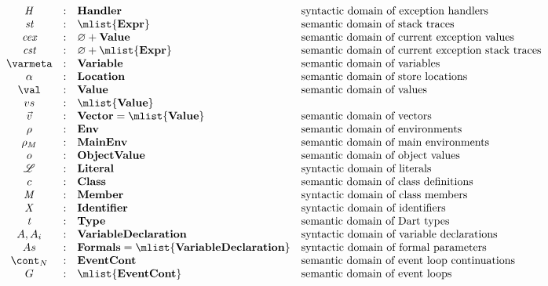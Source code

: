 \documentclass[a4paper,oneside,fleqn]{article}
\renewcommand{\emptyset}{\varnothing}
\newcommand{\dexpr}{\mathbf{Expr}}
\newcommand{\dhandler}{\mathbf{Handler}}
\newcommand{\dncont}{\mathbf{EventCont}}
\newcommand{\denv}{\mathbf{Env}}
\newcommand{\dmenv}{\mathbf{MainEnv}}
\newcommand{\dval}{\mathbf{Value}}
\newcommand{\dlit}{\mathbf{Literal}}
\newcommand{\dvar}{\mathbf{Variable}}
\newcommand{\dvardecl}{\mathbf{VariableDeclaration}}
\newcommand{\dobjval}{\mathbf{ObjectValue}}
\newcommand{\dvector}{\mathbf{Vector}}
\newcommand{\dmember}{\mathbf{Member}}
\newcommand{\dident}{\mathbf{Identifier}}
\newcommand{\idmeta}{\ensuremath{\mathit{X}}}
\newcommand{\dtype}{\mathbf{Type}}
\newcommand{\typemeta}{\ensuremath{\mathit{t}}}
\newcommand{\dclass}{\mathbf{Class}}
\newcommand{\dformals}{\mathbf{Formals}}
\begin{document}
\[\begin{array}{ccll}
    \handler
    & : & \dhandler & \text{syntactic domain of exception handlers} \\
    \strace
    & : & \mlist{\dexpr} & \text{semantic domain of stack traces}\\
    \cex
    & : &  \emptyset + \dval & \text{semantic domain of current exception values}\\
    \cstrace
    & : & \emptyset + \mlist{\dexpr} & \text{semantic domain of current exception stack traces}\\
    \varmeta
    & : & \dvar & \text{semantic domain of variables}\\
    \loc
    & : & \dlocation & \text{semantic domain of store locations}\\
    \val
    & : & \dval & \text{semantic domain of values}\\
    \vals & : & \mlist{\dval} \\
    \vvec & : & \dvector = \mlist{\dval}& \text{semantic domain of vectors}\\
    \env
    & : & \denv & \text{semantic domain of environments}\\
    \mainenv
    & : & \dmenv & \text{semantic domain of main environments}\\
    \obj
    & : & \dobjval & \text{semantic domain of object values}\\
    \lit
    & : & \dlit & \text{syntactic domain of literals}\\
    \classvar
    & : & \dclass & \text{semantic domain of class definitions}\\
    \membermeta
    & : & \dmember & \text{syntactic domain of class members}\\
    \idmeta
    & : & \dident & \text{syntactic domain of identifiers}\\
    \typemeta & : & \dtype & \text{semantic domain of Dart types}\\
    \formal, \formali{i} & : & \dvardecl & \text{syntactic domain of variable declarations} \\
    \formals & : & \dformals = \mlist{\dvardecl} &\text{syntactic domain of formal parameters}\\
    \ncont & : & \dncont &\text{semantic domain of event loop continuations}\\
    \eventloop & : & \mlist{\dncont} &\text{semantic domain of event loops}\\
  \end{array}
\]

\newcommand{\expressionmeta}{\ensuremath{\mathit{E}}}
\newcommand{\expressionsmeta}{\expressionmeta{s}}
\newcommand{\variablemeta}{\ensuremath{\mathit{x}}}
\newcommand{\boolmeta}{\ensuremath{\mathit{B}}}
\newcommand{\integermeta}{\ensuremath{\mathit{I}}}
\newcommand{\doublemeta}{\ensuremath{\mathit{D}}}
\newcommand{\stringmeta}{\ensuremath{\mathit{S}}}
\newcommand{\statementmeta}{\ensuremath{\mathit{\stmt}}}
\end{document}
